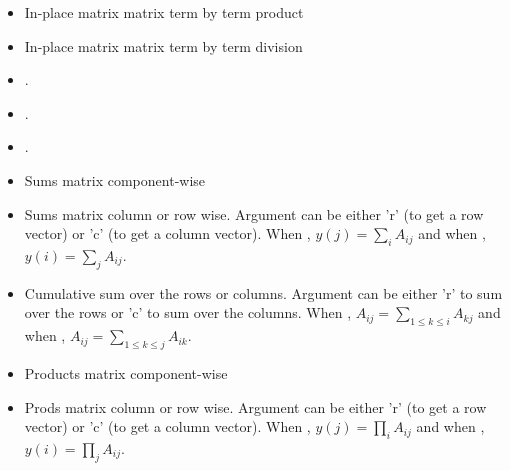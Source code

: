 \begin{itemize}
\item {} 
  \sshortdescribe In-place matrix matrix term by term product  

\item {} 
  \sshortdescribe In-place matrix matrix term by term division

\item {} 
  \sshortdescribe {}.


\item {} 
    \sshortdescribe {}.

\item {} 
  \sshortdescribe {}.

\item {}
  \sshortdescribe Sums matrix component-wise  

\item {}
  \sshortdescribe Sums matrix column or row wise. Argument  can be
  either 'r' (to get a row vector) or 'c' (to get a column vector). When
  , $y(j) = \sum_i A_{ij}$ and when , $y(i) = \sum_j
  A_{ij}$.

\item {} 
  \sshortdescribe Cumulative sum over the rows or columns. Argument 
  can be either 'r' to sum over the rows or 'c' to sum over the columns. When
  , $A_{ij} = \sum_{1 \le k \le i} A_{kj}$ and when , 
  $A_{ij} = \sum_{1 \le k \le j} A_{ik}$.

\item {}
  \sshortdescribe Products matrix component-wise

\item {}
  \sshortdescribe Prods matrix column or row wise. Argument  can be
  either 'r' (to get a row vector) or 'c' (to get a column vector). When
  , $y(j) = \prod_i A_{ij}$ and when , $y(i) = \prod_j
  A_{ij}$.


\end{itemize}
